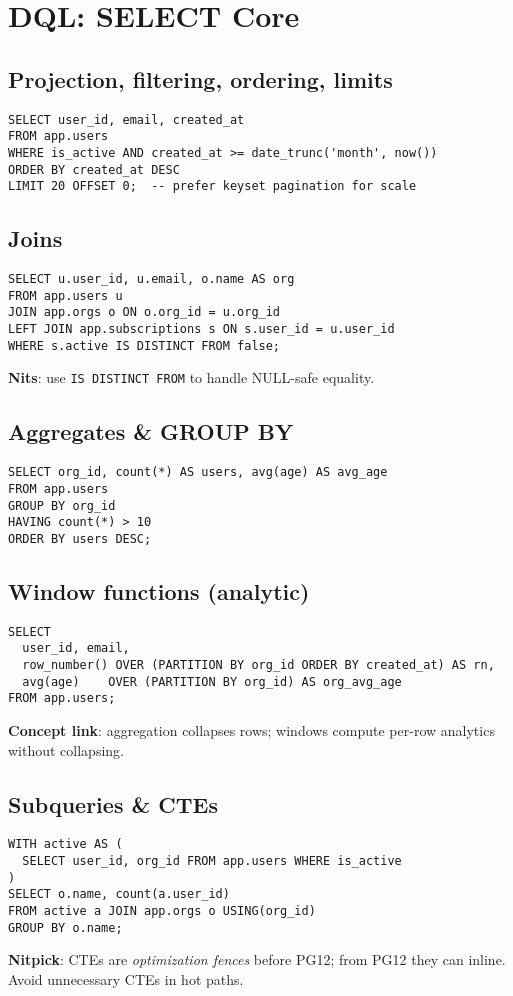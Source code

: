 \documentclass[10pt]{article}
\begin{document}
\section{DQL: SELECT Core}
\subsection{Projection, filtering, ordering, limits}
\begin{lstlisting}[style=psql]
SELECT user_id, email, created_at
FROM app.users
WHERE is_active AND created_at >= date_trunc('month', now())
ORDER BY created_at DESC
LIMIT 20 OFFSET 0;  -- prefer keyset pagination for scale
\end{lstlisting}

\subsection{Joins}
\begin{lstlisting}[style=psql]
SELECT u.user_id, u.email, o.name AS org
FROM app.users u
JOIN app.orgs o ON o.org_id = u.org_id
LEFT JOIN app.subscriptions s ON s.user_id = u.user_id
WHERE s.active IS DISTINCT FROM false;
\end{lstlisting}
\textbf{Nits}: use \texttt{IS DISTINCT FROM} to handle NULL-safe equality.

\subsection{Aggregates \& GROUP BY}
\begin{lstlisting}[style=psql]
SELECT org_id, count(*) AS users, avg(age) AS avg_age
FROM app.users
GROUP BY org_id
HAVING count(*) > 10
ORDER BY users DESC;
\end{lstlisting}

\subsection{Window functions (analytic)}
\begin{lstlisting}[style=psql]
SELECT
  user_id, email,
  row_number() OVER (PARTITION BY org_id ORDER BY created_at) AS rn,
  avg(age)    OVER (PARTITION BY org_id) AS org_avg_age
FROM app.users;
\end{lstlisting}
\textbf{Concept link}: aggregation collapses rows; windows compute per-row analytics without collapsing.

\subsection{Subqueries \& CTEs}
\begin{lstlisting}[style=psql]
WITH active AS (
  SELECT user_id, org_id FROM app.users WHERE is_active
)
SELECT o.name, count(a.user_id)
FROM active a JOIN app.orgs o USING(org_id)
GROUP BY o.name;
\end{lstlisting}
\textbf{Nitpick}: CTEs are \emph{optimization fences} before PG12; from PG12 they can inline. Avoid unnecessary CTEs in hot paths.
\end{document}
